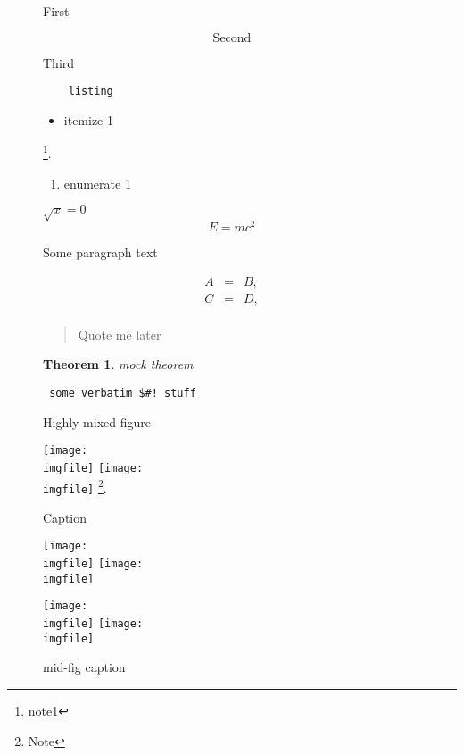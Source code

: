 \documentclass{article}
\newtheorem{theorem}{Theorem}
\def\imgfile{../graphics/none.png}
\begin{document}
\begin{figure}
  \begin{center}
  First
  \end{center}
  \[ \mathrm{Second} \]
  \begin{center}
  Third
  \end{center}
\end{figure}
\clearpage

\begin{figure}
  \begin{lstlisting}
    listing
  \end{lstlisting}%
  \begin{itemize}\item itemize 1 \end{itemize}\footnote{note1}.%
  \begin{enumerate}\item enumerate 1 \end{enumerate}%
  $ \sqrt{x} = 0 $%
  \[ E = mc^2 \]%

  Some paragraph text

  \begin{eqnarray*}
    A&=&B,\\
    C&=&D,\\
  \end{eqnarray*}
  \begin{quote}Quote me later\end{quote}%
  \begin{theorem} mock theorem \end{theorem}%
  \begin{verbatim} some verbatim $#! stuff \end{verbatim}%
  \caption{Highly mixed figure}
\end{figure}
\clearpage

\begin{figure}
  \texttt{[image: \\imgfile]}\hspace{2cm}%
  \texttt{[image: \\imgfile]}%
  \footnote{Note}.
  \caption{Caption}
\end{figure}
\clearpage

\begin{figure}
  \texttt{[image: \\imgfile]}\hspace{2cm}%
  \texttt{[image: \\imgfile]}\newline
  \caption{mid-fig caption}
  \texttt{[image: \\imgfile]}\hspace{2cm}%
  \texttt{[image: \\imgfile]}%
\end{figure}
\clearpage
\end{document}
